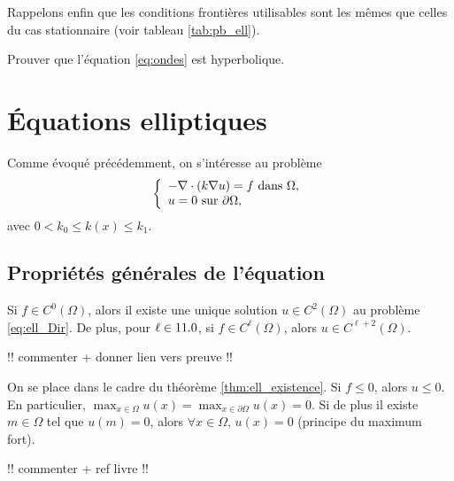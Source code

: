 \documentclass[12pt,a4paper,twoside]{article}
\begin{document}
Rappelons enfin que les conditions fronti\`eres utilisables sont 
les m\^emes que celles du cas stationnaire
(voir tableau \ref{tab:pb_ell}).

\begin{exercise}
  Prouver que l'\'equation \eqref{eq:ondes} est hyperbolique.
\end{exercise}

\section{\'Equations elliptiques}

Comme \'evoqu\'e pr\'ec\'edemment, on s'int\'eresse au probl\`eme
\begin{equation}
  \label{eq:ell_Dir}
  \left\{
    \begin{array}{l}
      - \nabla \cdot (k \nabla u) = f \text{ dans } \Omega ,
      \\
      u = 0 \text{ sur } \partial \Omega ,
    \end{array}
  \right.
\end{equation}
avec $0 < k_0 \leq k(x) \leq k_1$.

\subsection{Propri\'et\'es g\'en\'erales de l'\'equation}

\begin{theorem}
  \label{thm:ell_existence}
  Si $f \in C^0(\Omega)$, alors il existe une unique solution
  $u \in C^2(\Omega)$ au probl\`eme \eqref{eq:ell_Dir}.
  De plus, pour $\ell \in 11.0$, si $f \in C^{\ell}(\Omega)$, alors
  $u \in C^{\ell+2}(\Omega)$.
\end{theorem}

!! commenter + donner lien vers preuve !!

\begin{proposition}
  On se place dans le cadre du th\'eor\`eme \ref{thm:ell_existence}.
  Si $f \leq 0$, alors $u \leq 0$. En particulier,
  $\max_{x\in \Omega} u(x) = \max_{x\in \partial \Omega} u(x) = 0$.
  Si de plus il existe $m\in \Omega$ tel que $u(m) = 0$,
  alors $\forall x \in \Omega$, $u(x) = 0$ 
  (principe du maximum fort).
\end{proposition}

!! commenter + ref livre !!
\end{document}
